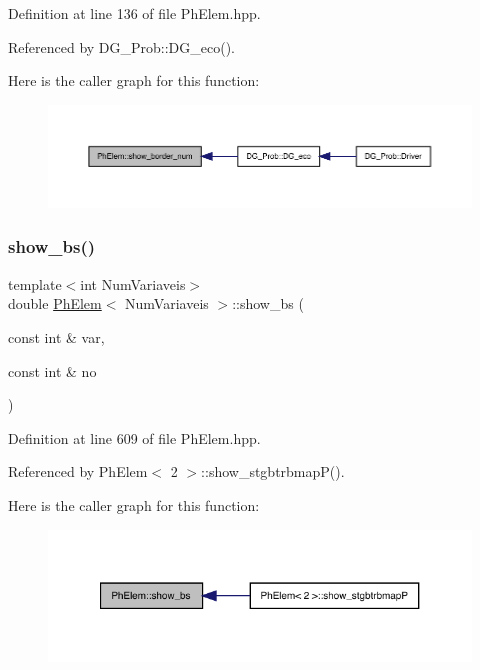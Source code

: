Definition at line 136 of file Ph\+Elem.\+hpp.



Referenced by D\+G\+\_\+\+Prob\+::\+D\+G\+\_\+eco().

Here is the caller graph for this function\+:
\nopagebreak
\begin{figure}[H]
\begin{center}
\leavevmode
\includegraphics[width=350pt]{classPhElem_a13564919b6d9747f0e6b33f3e8aae31b_icgraph}
\end{center}
\end{figure}
\mbox{\label{classPhElem_a0846ec2cbd31a24aea440c29a71d50ec}} 
\subsubsection{\texorpdfstring{show\+\_\+bs()}{show\_bs()}}
{\footnotesize\ttfamily template$<$int Num\+Variaveis$>$ \\
double \hyperlink{classPhElem}{Ph\+Elem}$<$ Num\+Variaveis $>$\+::show\+\_\+bs (\begin{DoxyParamCaption}\item[{const int \&}]{var,  }\item[{const int \&}]{no }\end{DoxyParamCaption})}



Definition at line 609 of file Ph\+Elem.\+hpp.



Referenced by Ph\+Elem$<$ 2 $>$\+::show\+\_\+stgbtrbmap\+P().

Here is the caller graph for this function\+:
\nopagebreak
\begin{figure}[H]
\begin{center}
\leavevmode
\includegraphics[width=321pt]{classPhElem_a0846ec2cbd31a24aea440c29a71d50ec_icgraph}
\end{center}
\end{figure}
\mbox{\label{classPhElem_a916c6927d0964574d815a13dd80f1e30}} 
